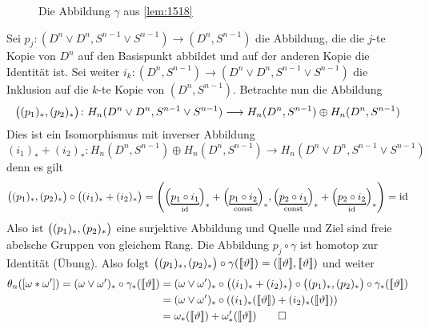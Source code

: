 \begin{beweis}
\begin{figure}[bht]
{
		\caption{Die Abbildung $\gamma$ aus \autoref{lem:1518}}}
	\end{figure}%
	Sei $p_j \colon (D^n \vee D^n, S^{n-1} \vee S^{n-1}) \to (D^n,S^{n-1})$ die Abbildung, die die $j$-te Kopie von $D^n$ auf den Basispunkt abbildet und auf der anderen Kopie die 
	Identität ist. Sei weiter $i_k \colon (D^n,S^{n-1}) \to (D^n \vee D^n, S^{n-1} \vee S^{n-1})$ die Inklusion auf die $k$-te Kopie von $(D^n, S^{n-1})$. Betrachte nun die Abbildung
	\[
		\enbrace[\big]{(p_1)_*, (p_2)_*} \colon H_n(D^n \vee D^n, S^{n-1} \vee S^{n-1}) \longrightarrow H_n(D^n,S^{n-1}) \oplus H_n(D^n,S^{n-1}) 
	\]
	Dies ist ein Isomorphismus mit inverser Abbildung
	\[
		(i_{1})_* + (i_2)_* \colon H_n(D^n,S^{n-1}) \oplus H_n(D^n,S^{n-1}) \longrightarrow H_n(D^n \vee D^n, S^{n-1} \vee S^{n-1})
	\]
	denn es gilt
	\begin{align*}
		\enbrace[\big]{(p_{1})_*, (p_{2})_*} \circ \enbrace[\big]{(i_{1})_* + (i_{2})_*} = \enbrace*{
		\enbrace[\Big]{\underbracket[0.8pt][1.2pt]{p_1 \circ i_1}_{\id}}_* + \enbrace[\Big]{\underbracket[0.8pt][1.2pt]{p_1 \circ i_2}_{\const}}_* , 
		\enbrace[\Big]{\underbracket[0.8pt][1.2pt]{p_2 \circ i_1}_{\const}}_* + \enbrace[\Big]{\underbracket[0.8pt][1.2pt]{p_2 \circ i_2}_{\id}} _*} = \id
	\end{align*}
	Also ist $\enbrace[\big]{(p_1)_*, (p_2)_*}$ eine surjektive Abbildung und Quelle und Ziel sind freie abelsche Gruppen von gleichem Rang. Die Abbildung $p_j \circ \gamma$ ist homotop 
	zur Identität (Übung). Also folgt 
	$\enbrace[\big]{(p_1)_*, (p_2)_*} \circ \gamma \enbrace*{\bbenbrace{\vartheta}} = \enbrace*{\bbenbrace{\vartheta}, \bbenbrace{\vartheta}} $ und weiter
	\begin{align*}
		\theta_n \enbrace*{\benbrace*{\omega * \omega'}} = (\omega \vee \omega')_* \circ \gamma_* \enbrace*{\bbenbrace{\vartheta}} &= 
		(\omega \vee \omega')_* \circ \enbrace[\big]{(i_1)_* + (i_2)_*} \circ \enbrace[\big]{(p_1)_*, (p_2)_*}   \circ \gamma_* \enbrace*{\bbenbrace{\vartheta}} \\
		&= (\omega \vee \omega')_* \circ \enbrace*{(i_1)_* \enbrace*{\bbenbrace{\vartheta}} + (i_2)_* \enbrace*{\bbenbrace{\vartheta}} } \\
		&= \omega_* \enbrace*{\bbenbrace{\vartheta}}  + \omega'_* \enbrace*{\bbenbrace{\vartheta}} \qedhere
	\end{align*}
\end{beweis}

